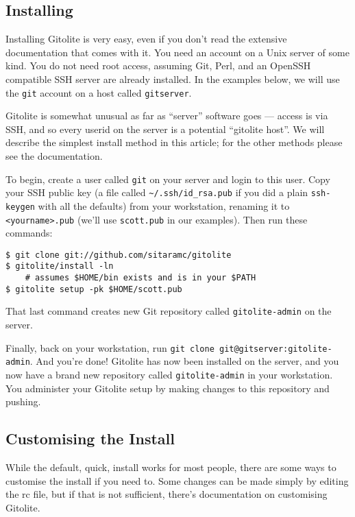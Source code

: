 \documentclass[a4paper]{book}
\begin{document}
\subsection{Installing}\label{installing}

Installing Gitolite is very easy, even if you don't read the extensive documentation that comes with it. You need an account on a Unix server of some kind. You do not need root access, assuming Git, Perl, and an OpenSSH compatible SSH server are already installed. In the examples below, we will use the \texttt{git} account on a host called \texttt{gitserver}.

Gitolite is somewhat unusual as far as “server” software goes --- access is via SSH, and so every userid on the server is a potential “gitolite host”. We will describe the simplest install method in this article; for the other methods please see the documentation.

To begin, create a user called \texttt{git} on your server and login to this user. Copy your SSH public key (a file called \texttt{\textasciitilde{}/.ssh/id\_rsa.pub} if you did a plain \texttt{ssh-keygen} with all the defaults) from your workstation, renaming it to \texttt{\textless{}yourname\textgreater{}.pub} (we'll use \texttt{scott.pub} in our examples). Then run these commands:

\begin{shaded}\begin{verbatim}
$ git clone git://github.com/sitaramc/gitolite
$ gitolite/install -ln
    # assumes $HOME/bin exists and is in your $PATH
$ gitolite setup -pk $HOME/scott.pub
\end{verbatim}\end{shaded}

That last command creates new Git repository called \texttt{gitolite-admin} on the server.

Finally, back on your workstation, run \texttt{git clone git@gitserver:gitolite-admin}. And you're done! Gitolite has now been installed on the server, and you now have a brand new repository called \texttt{gitolite-admin} in your workstation. You administer your Gitolite setup by making changes to this repository and pushing.

\subsection{Customising the Install}\label{customising-the-install}

While the default, quick, install works for most people, there are some ways to customise the install if you need to. Some changes can be made simply by editing the rc file, but if that is not sufficient, there's documentation on customising Gitolite.
\end{document}
